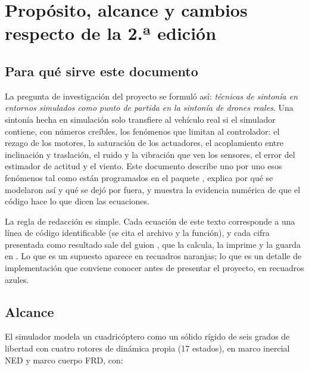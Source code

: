 \section{Propósito, alcance y cambios respecto de la 2.ª edición}
\label{sec:proposito}

\subsection{Para qué sirve este documento}

La pregunta de investigación del proyecto se formuló así:
\emph{técnicas de sintonía en entornos simulados como punto de partida en la
sintonía de drones reales}. Una sintonía hecha en simulación solo transfiere
al vehículo real si el simulador contiene, con números creíbles, los
fenómenos que limitan al controlador: el rezago de los motores, la saturación
de los actuadores, el acoplamiento entre inclinación y traslación, el ruido y
la vibración que ven los sensores, el error del estimador de actitud y el
viento. Este documento describe uno por uno esos fenómenos tal como están
programados en el paquete , explica por qué se modelaron así y
qué se dejó por fuera, y muestra la evidencia numérica de que el código hace
lo que dicen las ecuaciones.

La regla de redacción es simple. Cada ecuación de este texto corresponde a una
línea de código identificable (se cita el archivo y la función), y cada cifra
presentada como resultado sale del guion
, que la calcula, la imprime y la
guarda en . Lo que es un
supuesto aparece en recuadros naranjas; lo que es un detalle de
implementación que conviene conocer antes de presentar el proyecto, en recuadros
azules.

\subsection{Alcance}

El simulador modela un cuadricóptero como un sólido rígido de seis grados de
libertad con cuatro rotores de dinámica propia (17 estados), en marco
inercial NED y marco cuerpo FRD, con:


